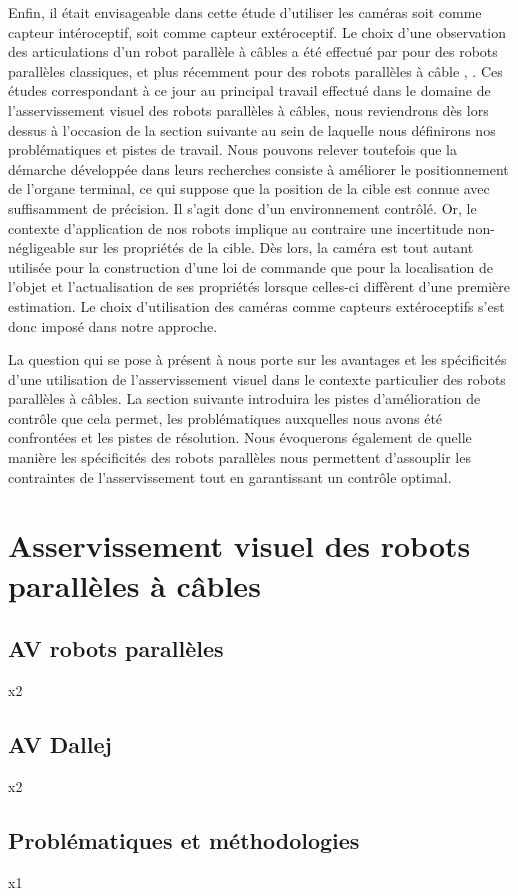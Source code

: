 Enfin, il était envisageable dans cette étude d'utiliser les caméras soit comme capteur intéroceptif, soit comme capteur extéroceptif. Le choix d'une observation des articulations d'un robot parallèle à câbles a été effectué par \cite{andreff2007} pour des robots parallèles classiques, et plus récemment pour des robots parallèles à câble \cite{dallej2011}, \cite{dallej2012}. Ces études correspondant à ce jour au principal travail effectué dans le domaine de l'asservissement visuel des robots parallèles à câbles, nous reviendrons dès lors dessus à l'occasion de la section suivante au sein de laquelle nous définirons nos problématiques et pistes de travail. Nous pouvons relever toutefois que la démarche développée dans leurs recherches consiste à améliorer le positionnement de l'organe terminal, ce qui suppose que la position de la cible est connue avec suffisamment de précision. Il s'agit donc d'un environnement contrôlé. Or, le contexte d'application de nos robots implique au contraire une incertitude non-négligeable sur les propriétés de la cible. Dès lors, la caméra est tout autant utilisée pour la construction d'une loi de commande que pour la localisation de l'objet et l'actualisation de ses propriétés lorsque celles-ci diffèrent d'une première estimation. Le choix d'utilisation des caméras comme capteurs extéroceptifs s'est donc imposé dans notre approche.

La question qui se pose à présent à nous porte sur les avantages et les spécificités d'une utilisation de l'asservissement visuel dans le contexte particulier des robots parallèles à câbles. La section suivante introduira les pistes d'amélioration de contrôle que cela permet, les problématiques auxquelles nous avons été confrontées et les pistes de résolution. Nous évoquerons également de quelle manière les spécificités des robots parallèles nous permettent d'assouplir les contraintes de l'asservissement tout en garantissant un contrôle optimal.

\section{Asservissement visuel des robots parallèles à câbles}

  \subsection{AV robots parallèles} x2

  \subsection{AV Dallej} x2

  \subsection{Problématiques et méthodologies} x1

